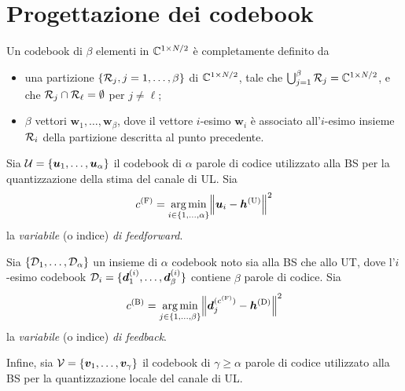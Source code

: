 \chapter{Progettazione dei codebook}
\label{app:codebook-design}

Un codebook di \(\beta\) elementi in \(\mathbb{C}^{1 \times N/2}\) è completamente
definito da
\begin{itemize}

    \item una partizione \(\{\mathcal{R}_j, j=1,\dots,\beta\}\) di
        \(\mathbb{C}^{1 \times N/2}\), tale che \(\bigcup_{j=1}^\beta \mathcal{R}_j = \mathbb{C}^{1
        \times N/2}\), e che \(\mathcal{R}_j \cap \mathcal{R}_\ell = \emptyset\) per
        \(j \neq \ell\);

    \item \(\beta\) vettori \(\bm{w}_1,\dots,\bm{w}_\beta\), dove il vettore
        \(i\)-esimo \(\bm{w}_i\) è associato all'\(i\)-esimo insieme
        \(\mathcal{R}_i\) della partizione descritta al punto precedente.

\end{itemize}

Sia \(\mathcal{U} = \{\bm{u}_1,\dots,\bm{u}_\alpha\}\) il codebook di \(\alpha\)
parole di codice utilizzato alla BS per la quantizzazione della stima del
canale di UL. Sia
\begin{equation}
    c^\mathrm{(F)} = \argmin_{i \in \{1,\dots,\alpha\}}
        \lnorm \bm{u}_i - \bm{h}^\mathrm{(U)} \rnorm^2
\end{equation}
la \textit{variabile} (o indice) \textit{di feedforward}.

Sia \(\{\mathcal{D}_1,\dots,\mathcal{D}_\alpha\}\) un insieme di \(\alpha\) codebook
noto sia alla BS che allo UT, dove l'\(i\)-esimo codebook \(\mathcal{D}_i =
\{\bm{d}_1^{(i)},\dots,\bm{d}_\beta^{(i)}\}\) contiene \(\beta\) parole di
codice. Sia
\begin{equation}
    c^\mathrm{(B)} = \argmin_{j \in \{1,\dots,\beta\}}
        \lnorm \bm{d}_j^{(c^\mathrm{(F)})} - \bm{h}^\mathrm{(D)} \rnorm^2
\end{equation}
la \textit{variabile} (o indice) \textit{di feedback}.

Infine, sia \(\mathcal{V} = \{\bm{v}_1,\dots,\bm{v}_\gamma\}\) il
codebook di \(\gamma \ge \alpha\) parole di codice utilizzato alla BS per la
quantizzazione locale del canale di UL.


